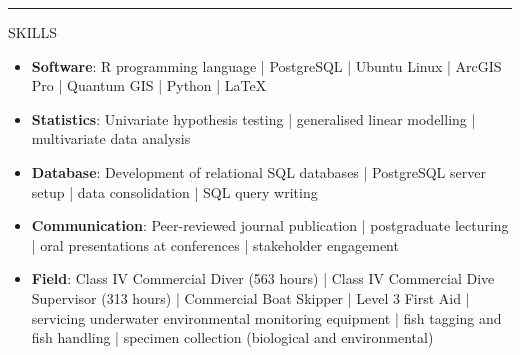 \documentclass[10pt,a4paper]{article}
\begin{document}
\hrule
\vspace{6pt}
\noindent
SKILLS
	\begin{itemize}
		\setlength\itemsep{0.05em}
		\item \textbf{Software}: R programming language | PostgreSQL | Ubuntu Linux | 
		ArcGIS Pro | Quantum GIS | Python | \LaTeX\
		\item \textbf{Statistics}: Univariate hypothesis testing | generalised linear modelling | 
		multivariate data analysis
		\item \textbf{Database}: Development of relational SQL databases | PostgreSQL server setup | data consolidation | SQL query writing
		\item \textbf{Communication}: Peer-reviewed journal publication | postgraduate lecturing | oral 
		presentations at conferences | stakeholder engagement
		\item \textbf{Field}: Class IV Commercial Diver (563 hours) | Class IV Commercial Dive Supervisor 
		(313 hours) | Commercial Boat Skipper | Level 3 First Aid | servicing underwater environmental 
		monitoring equipment | fish tagging and fish handling | specimen collection (biological and					environmental)
	\end{itemize}	
\end{document}
